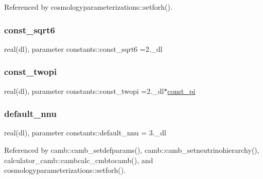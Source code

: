 Referenced by cosmologyparameterizations\+::setforh().

\mbox{\label{namespaceconstants_af93a9bf45c9332880bda283f3b872ea3}} 
\subsubsection{\texorpdfstring{const\+\_\+sqrt6}{const\_sqrt6}}
{\footnotesize\ttfamily real(dl), parameter constants\+::const\+\_\+sqrt6 =2.\+\_\+dl}

\mbox{\label{namespaceconstants_ad32ef1a62efe7e7467e8533103380ce5}} 
\subsubsection{\texorpdfstring{const\+\_\+twopi}{const\_twopi}}
{\footnotesize\ttfamily real(dl), parameter constants\+::const\+\_\+twopi =2.\+\_\+dl$\ast$\mbox{\hyperlink{namespaceconstants_ae6b5af15d3fb28a3dba468486c548447}{const\+\_\+pi}}}

\mbox{\label{namespaceconstants_ad19a8a2f8a16b3a9b6531f328738d512}} 
\subsubsection{\texorpdfstring{default\+\_\+nnu}{default\_nnu}}
{\footnotesize\ttfamily real(dl), parameter constants\+::default\+\_\+nnu = 3.\+\_\+dl}



Referenced by camb\+::camb\+\_\+setdefparams(), camb\+::camb\+\_\+setneutrinohierarchy(), calculator\+\_\+camb\+::cambcalc\+\_\+cmbtocamb(), and cosmologyparameterizations\+::setforh().

\mbox{\label{namespaceconstants_ada63d24886097f6dead4ef56b434f785}} 

